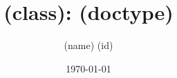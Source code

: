 \documentclass[letterpaper,12pt]{article}
\begin{document}
	
	\title{(class): (doctype)}
	\author{(name) (id)}
	\date{\today}
	\maketitle
	
\end{document}
